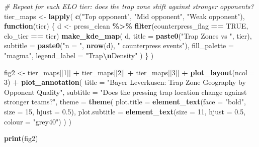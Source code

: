 \documentclass[
]{article}
\newenvironment{Shaded}{\begin{snugshade}}{\end{snugshade}}
\newcommand{\AttributeTok}[1]{\textcolor[rgb]{0.13,0.29,0.53}{#1}}
\newcommand{\CommentTok}[1]{\textcolor[rgb]{0.56,0.35,0.01}{\textit{#1}}}
\newcommand{\ConstantTok}[1]{\textcolor[rgb]{0.56,0.35,0.01}{#1}}
\newcommand{\ControlFlowTok}[1]{\textcolor[rgb]{0.13,0.29,0.53}{\textbf{#1}}}
\newcommand{\DecValTok}[1]{\textcolor[rgb]{0.00,0.00,0.81}{#1}}
\newcommand{\FloatTok}[1]{\textcolor[rgb]{0.00,0.00,0.81}{#1}}
\newcommand{\FunctionTok}[1]{\textcolor[rgb]{0.13,0.29,0.53}{\textbf{#1}}}
\newcommand{\NormalTok}[1]{#1}
\newcommand{\OtherTok}[1]{\textcolor[rgb]{0.56,0.35,0.01}{#1}}
\newcommand{\SpecialCharTok}[1]{\textcolor[rgb]{0.81,0.36,0.00}{\textbf{#1}}}
\newcommand{\StringTok}[1]{\textcolor[rgb]{0.31,0.60,0.02}{#1}}
\begin{document}
\begin{Shaded}
\begin{Highlighting}[]
\CommentTok{\# Repeat for each ELO tier: does the trap zone shift against stronger opponents?}
\NormalTok{tier\_maps }\OtherTok{\textless{}{-}} \FunctionTok{lapply}\NormalTok{(}
  \FunctionTok{c}\NormalTok{(}\StringTok{"Top opponent"}\NormalTok{, }\StringTok{"Mid opponent"}\NormalTok{, }\StringTok{"Weak opponent"}\NormalTok{),}
  \ControlFlowTok{function}\NormalTok{(tier) \{}
\NormalTok{    d }\OtherTok{\textless{}{-}}\NormalTok{ press\_clean }\SpecialCharTok{\%\textgreater{}\%} \FunctionTok{filter}\NormalTok{(counterpress\_flag }\SpecialCharTok{==} \ConstantTok{TRUE}\NormalTok{, elo\_tier }\SpecialCharTok{==}\NormalTok{ tier)}
    \FunctionTok{make\_kde\_map}\NormalTok{(}
\NormalTok{      d,}
      \AttributeTok{title        =} \FunctionTok{paste0}\NormalTok{(}\StringTok{"Trap Zones vs "}\NormalTok{, tier),}
      \AttributeTok{subtitle     =} \FunctionTok{paste0}\NormalTok{(}\StringTok{"n = "}\NormalTok{, }\FunctionTok{nrow}\NormalTok{(d), }\StringTok{" counterpress events"}\NormalTok{),}
      \AttributeTok{fill\_palette =} \StringTok{"magma"}\NormalTok{,}
      \AttributeTok{legend\_label =} \StringTok{"Trap}\SpecialCharTok{\textbackslash{}n}\StringTok{Density"}
\NormalTok{    )}
\NormalTok{  \}}
\NormalTok{)}

\NormalTok{fig2 }\OtherTok{\textless{}{-}}\NormalTok{ tier\_maps[[}\DecValTok{1}\NormalTok{]] }\SpecialCharTok{+}\NormalTok{ tier\_maps[[}\DecValTok{2}\NormalTok{]] }\SpecialCharTok{+}\NormalTok{ tier\_maps[[}\DecValTok{3}\NormalTok{]] }\SpecialCharTok{+}
  \FunctionTok{plot\_layout}\NormalTok{(}\AttributeTok{ncol =} \DecValTok{3}\NormalTok{) }\SpecialCharTok{+}
  \FunctionTok{plot\_annotation}\NormalTok{(}
    \AttributeTok{title    =} \StringTok{"Bayer Leverkusen: Trap Zone Geography by Opponent Quality"}\NormalTok{,}
    \AttributeTok{subtitle =} \StringTok{"Does the pressing trap location change against stronger teams?"}\NormalTok{,}
    \AttributeTok{theme    =} \FunctionTok{theme}\NormalTok{(}
      \AttributeTok{plot.title    =} \FunctionTok{element\_text}\NormalTok{(}\AttributeTok{face =} \StringTok{"bold"}\NormalTok{, }\AttributeTok{size =} \DecValTok{15}\NormalTok{, }\AttributeTok{hjust =} \FloatTok{0.5}\NormalTok{),}
      \AttributeTok{plot.subtitle =} \FunctionTok{element\_text}\NormalTok{(}\AttributeTok{size =} \DecValTok{11}\NormalTok{, }\AttributeTok{hjust =} \FloatTok{0.5}\NormalTok{, }\AttributeTok{colour =} \StringTok{"grey40"}\NormalTok{)}
\NormalTok{    )}
\NormalTok{  )}

\FunctionTok{print}\NormalTok{(fig2)}
\end{Highlighting}
\end{Shaded}
\end{document}
